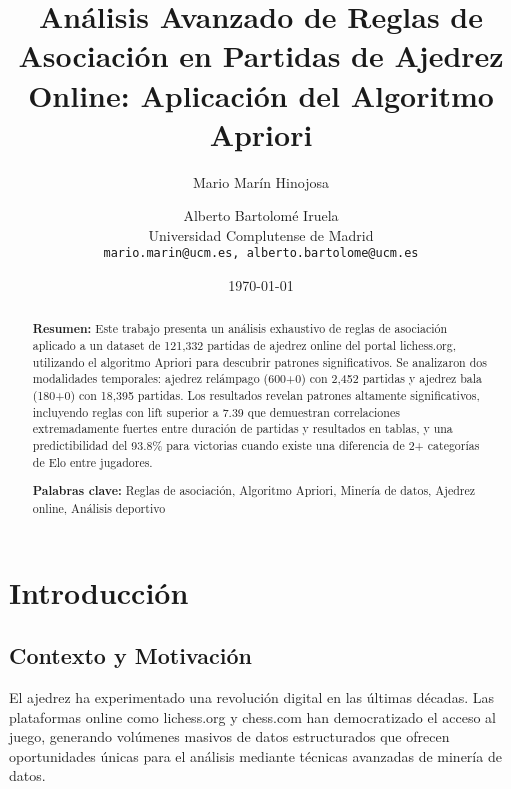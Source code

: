 \documentclass[11pt,a4paper]{article}
\begin{document}
\title{\textbf{An\'alisis Avanzado de Reglas de Asociaci\'on en Partidas de Ajedrez Online: Aplicaci\'on del Algoritmo Apriori}}

\author{Mario Mar\'in Hinojosa \and Alberto Bartolom\'e Iruela\\
\small Universidad Complutense de Madrid\\
\small \texttt{mario.marin@ucm.es, alberto.bartolome@ucm.es}}

\date{\today}

\maketitle

\begin{abstract}
\noindent \textbf{Resumen:} Este trabajo presenta un an\'alisis exhaustivo de reglas de asociaci\'on aplicado a un dataset de 121,332 partidas de ajedrez online del portal lichess.org, utilizando el algoritmo Apriori para descubrir patrones significativos. Se analizaron dos modalidades temporales: ajedrez rel\'ampago (600+0) con 2,452 partidas y ajedrez bala (180+0) con 18,395 partidas. Los resultados revelan patrones altamente significativos, incluyendo reglas con lift superior a 7.39 que demuestran correlaciones extremadamente fuertes entre duraci\'on de partidas y resultados en tablas, y una predictibilidad del 93.8\% para victorias cuando existe una diferencia de 2+ categor\'ias de Elo entre jugadores.

\noindent \textbf{Palabras clave:} Reglas de asociaci\'on, Algoritmo Apriori, Miner\'ia de datos, Ajedrez online, An\'alisis deportivo
\end{abstract}

\tableofcontents
\newpage

\section{Introducci\'on}

\subsection{Contexto y Motivaci\'on}

El ajedrez ha experimentado una revoluci\'on digital en las \'ultimas d\'ecadas. Las plataformas online como lichess.org y chess.com han democratizado el acceso al juego, generando vol\'umenes masivos de datos estructurados que ofrecen oportunidades \'unicas para el an\'alisis mediante t\'ecnicas avanzadas de miner\'ia de datos.
\end{document}
